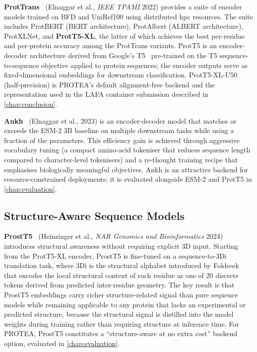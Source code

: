 \textbf{ProtTrans}~\cite{elnaggar2022prottrans} (Elnaggar et al., \textit{IEEE
TPAMI} 2022) provides a suite of encoder models trained on BFD and UniRef100
using distributed \gls{hpc} resources. The suite includes ProtBERT (BERT architecture),
ProtAlbert (ALBERT architecture), ProtXLNet, and \textbf{ProtT5-XL}, the latter
of which achieves the best per-residue and per-protein accuracy among the
ProtTrans variants. ProtT5 is an encoder-decoder architecture derived from
Google's T5~\cite{raffel2020t5} pre-trained on the T5 sequence-to-sequence objective applied to
protein sequences; the encoder outputs serve as fixed-dimensional embeddings for
downstream classification. ProtT5-XL-U50 (half-precision) is PROTEA's default
alignment-free backend and the representation used in the LAFA container
submission described in \cref{chap:conclusion}.

\textbf{Ankh}~\cite{elnaggar2023ankh} (Elnaggar et al., 2023) is an
encoder-decoder model that matches or exceeds the ESM-2 3B baseline on multiple
downstream tasks while using a fraction of the parameters. This efficiency gain is
achieved through aggressive vocabulary tuning (a compact amino-acid tokeniser
that reduces sequence length compared to character-level tokenisers) and a
re-thought training recipe that emphasises biologically meaningful objectives.
Ankh is an attractive backend for resource-constrained deployments; it is
evaluated alongside ESM-2 and ProtT5 in \cref{chap:evaluation}.

\subsection{Structure-Aware Sequence Models}
\label{subsec:related-struct-seq}

\textbf{ProstT5}~\cite{heinzinger2023prostt5} (Heinzinger et al., \textit{NAR
Genomics and Bioinformatics} 2024) introduces structural awareness without
requiring explicit 3D input. Starting from the ProtT5-XL encoder, ProstT5 is
fine-tuned on a sequence-to-3Di translation task, where 3Di is the structural
alphabet introduced by Foldseek~\cite{vankempen2024foldseek} that encodes the
local structural context of each residue as one of 20 discrete tokens derived
from predicted inter-residue geometry. The key result is that ProstT5 embeddings
carry richer structure-related signal than pure sequence models while remaining
applicable to any protein that lacks an experimental or predicted structure,
because the structural signal is distilled into the model weights during
training rather than requiring structure at inference time. For PROTEA, ProstT5
constitutes a ``structure-aware at no extra cost'' backend option, evaluated in
\cref{chap:evaluation}.

